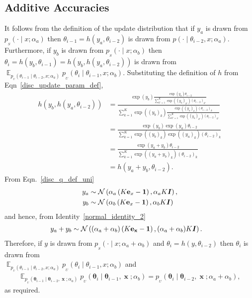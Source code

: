 \documentclass[11pt,table]{article}
\DeclareMathOperator*{\E}{\mathbb{E}}
\DeclareMathOperator{\x}{\mathbf{x}}
\newcommand{\N}[2]{\mathcal{N}\left(#1 , #2\right)}
\newcommand{\I}[1]{\boldsymbol{I}}
\newcommand{\tidx}[2]{#1_{#2}}
\renewcommand{\vec}[1]{\boldsymbol{#1}}
\newcommand{\pars}{\theta}
\newcommand{\parsn}{\vec{\pars}}
\newcommand{\parst}[1]{\tidx{\pars}{#1}}
\newcommand{\parsnt}[1]{\tidx{\parsn}{#1}}
\newcommand{\0}[1]{\constvec{0}{#1}}
\newcommand{\1}[1]{\constvec{1}{#1}}
\newcommand{\oh}[2]{\mathbf{e}_{#1}}
\newcommand{\sender}[2]{p_{_S}\left(#1 \mid #2\right)}
\newcommand{\update}{p_{_U}}
\begin{document}
\subsection{Additive Accuracies}\label{sec:disc_additive}
It follows from the definition of the update distribution that if $y_a$ is drawn from $\sender{\cdot}{x; \alpha_a}$ then $\parst{i-1} = h(y_a, \parst{i-2})$ is drawn from $p(\cdot \mid \parst{i-2}, x; \alpha_a)$.
Furthermore, if $y_b$ is drawn from $\sender{\cdot}{x; \alpha_b}$ then $\parst{i} = h(y_b, \parst{i-1}) = h(y_b, h(y_a, \parst{i-2}))$ is drawn from $\E_{\update(\parst{i-1} \mid \parst{i-2}, x; \alpha_a)} \update(\parst{i} \mid \parst{i-1}, x; \alpha_b)$.
Substituting the definition of $h$ from Eqn~\ref{disc_update_param_def},
\begin{align}
h(y_b, h(y_a, \theta_{i-2})) &= \frac{\exp(y_b) \frac{\exp(y_a)\theta_{i-2}}{\sum_{k'=1}^K\exp\left((y_a)_{k'}\right)(\theta_{i-2})_{k'}}}{\sum_{k=1}^K \exp\left((y_b)_k\right)\frac{\exp\left((y_a)_k\right)(\theta_{i-2})_k}{\sum_{k'=1}^K\exp\left((y_a)_{k'}\right)(\theta_{i-2})_{k'}}}\\
&= \frac{\exp(y_b) \exp(y_a)\theta_{i-2}}{\sum_{k=1}^K \exp\left((y_b)_k\right) \exp\left((y_a)_k\right)(\theta_{i-2})_k}\\
&= \frac{\exp(y_a + y_b)\theta_{i-2}}{\sum_{k=1}^K \exp\left((y_a+y_b)_k\right)(\theta_{i-2})_k}\\
&= h(y_a+y_b, \theta_{i-2}).
\end{align}
From Eqn.~\ref{disc_q_def_uni}
\begin{align}
y_{a} &\sim \N{\alpha_a\left(K \oh{x}{K} - \1{K}\right)}{\alpha_a K \I{K}},\\
y_{b} &\sim \N{\alpha_b\left(K \oh{x}{K} - \1{K}\right)}{\alpha_b K \I{K}}\\
\end{align}
and hence, from Identity~\ref{normal_identity_2}
\begin{align}
y_{a} + y_b &\sim \N{(\alpha_a+\alpha_b)\left(K \oh{\x}{KD} - \1{K}\right)}{(\alpha_a+\alpha_b) K \I{K}}.
\end{align}
Therefore, if $y$ is drawn from $\sender{\cdot}{x; \alpha_a + \alpha_b}$ and $\parst{i} = h(y, \parst{i-2})$ then $\parst{i}$ is drawn from\\ $\E_{\update(\parst{i-1} \mid \parst{i-2}, x; \alpha_a)} \update(\parst{i} \mid \parst{i-1}, x; \alpha_b)$ and
\begin{align}
\E_{\update(\parsnt{i-1}\mid \parsnt{i-2}, \x; \alpha_a)} \update(\parsnt{i} \mid \parsnt{i-1}, \x; \alpha_b) =  \update(\parsnt{i} \mid \parsnt{i-2}, \x; \alpha_a + \alpha_b),
\end{align}
as required. 
\end{document}
